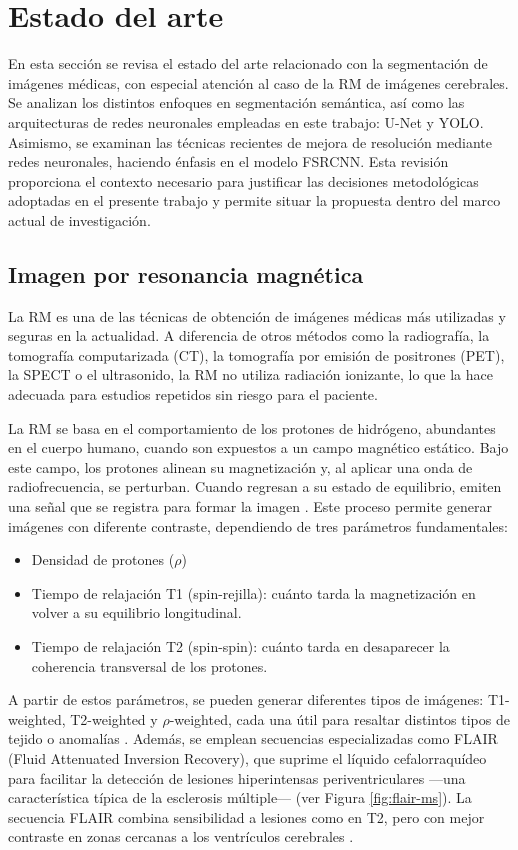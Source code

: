 \documentclass[../main.tex]{subfiles}
\begin{document}
\section{Estado del arte}
En esta sección se revisa el estado del arte relacionado con la segmentación de imágenes médicas, con especial atención al caso de la RM de imágenes cerebrales. Se analizan los distintos enfoques en segmentación semántica, así como las arquitecturas de redes neuronales empleadas en este trabajo: U-Net y YOLO. Asimismo, se examinan las técnicas recientes de mejora de resolución mediante redes neuronales, haciendo énfasis en el modelo FSRCNN. Esta revisión proporciona el contexto necesario para justificar las decisiones metodológicas adoptadas en el presente trabajo y permite situar la propuesta dentro del marco actual de investigación.

\subsection{Imagen por resonancia magnética}
La RM es una de las técnicas de obtención de imágenes médicas más utilizadas y seguras en la actualidad. A diferencia de otros métodos como la radiografía, la tomografía computarizada (CT), la tomografía por emisión de positrones (PET), la SPECT o el ultrasonido, la RM no utiliza radiación ionizante, lo que la hace adecuada para estudios repetidos sin riesgo para el paciente.

La RM se basa en el comportamiento de los protones de hidrógeno, 
abundantes en el cuerpo humano, cuando son expuestos a un campo magnético estático. Bajo este campo, los protones alinean su magnetización y, al aplicar una onda de radiofrecuencia, se perturban. Cuando regresan a su estado de equilibrio, emiten una señal que se registra para formar la imagen \cite{brown2014mri}. Este proceso permite generar imágenes con diferente contraste, dependiendo de tres parámetros fundamentales:

\begin{itemize}
    \item Densidad de protones ($\rho$)
    \item Tiempo de relajación T1 (spin-rejilla): cuánto tarda la 
    magnetización en volver a su equilibrio longitudinal.
    \item Tiempo de relajación T2 (spin-spin): cuánto tarda en desaparecer
    la coherencia transversal de los protones.
\end{itemize}
    
A partir de estos parámetros, se pueden generar diferentes tipos de imágenes: T1-weighted, T2-weighted y $\rho$-weighted, cada una útil para resaltar distintos tipos de tejido o anomalías \cite{Balafar2010}. Además, se emplean secuencias especializadas como FLAIR (Fluid Attenuated Inversion Recovery), que suprime el líquido cefalorraquídeo para facilitar la detección de lesiones hiperintensas periventriculares —una característica típica de la esclerosis múltiple— (ver Figura \ref{fig:flair-ms}). La secuencia FLAIR combina sensibilidad a lesiones como en T2, pero con mejor contraste en zonas cercanas a los ventrículos cerebrales \cite{bakshi2001fluid}.
\end{document}
